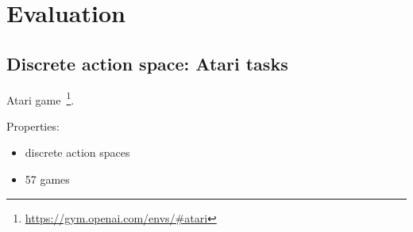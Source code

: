 \section{Evaluation}












\subsection{Discrete action space: Atari tasks}
Atari game~\footnote{\url{https://gym.openai.com/envs/\#atari}}.

Properties:
\begin{itemize}
\item discrete action spaces
\item 57 games
\end{itemize}

